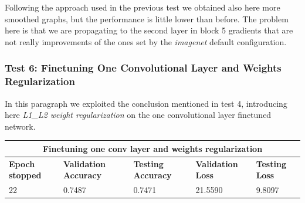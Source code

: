 Following the approach used in the previous test we obtained also here more smoothed graphs, but the performance is little lower than before. The problem here is that we are propagating to the second layer in block 5 gradients that are not really improvements of the ones set by the \textit{imagenet} default configuration.






\subsubsection{Test 6: Finetuning One Convolutional Layer and Weights Regularization}
In this paragraph we exploited the conclusion mentioned in test 4, introducing here \textit{L1\_L2 weight regularization} on the one convolutional layer finetuned network.


\medskip

\begin{tabular}{ |p{2cm}|p{2cm}|p{2cm}|p{2cm}|p{2cm}|  }
\hline
\multicolumn{5}{|c|}{Finetuning one conv layer and weights regularization} \\
\hline
\textbf{Epoch stopped} & \textbf{Validation Accuracy} & \textbf{Testing Accuracy} & \textbf{Validation Loss} & \textbf{Testing Loss} \\
\hline
22& 0.7487 & 0.7471 & 21.5590 & 9.8097\\
\hline
\end{tabular}

\medskip

